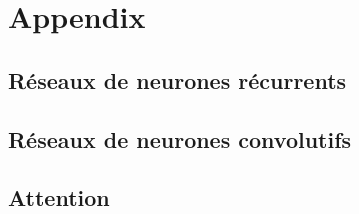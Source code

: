 \chapter{Appendix}
\label{app:A}


\section{Réseaux de neurones récurrents}
\section{Réseaux de neurones convolutifs}
\section{Attention}